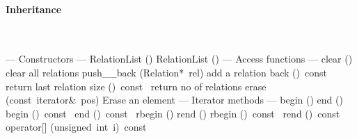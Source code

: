 \documentclass{article}
\begin{document}
\begin{cxxentry}
\begin{cxxclass}
\begin{cxxInheritance}
\paragraph{Inheritance}\strut\smallskip\strut\\
\end{cxxInheritance}
\begin{cxxpublic}
\cxxitem{}
        {--- Constructors --- }
        {}
        {}
        {}
\label{cxx.1.5.1}
\cxxitem{}
        {RelationList}
        {()}
        {}
        {}
\label{cxx.1.5.2}
        {\cxxtilde RelationList}
        {()}
        {}
        {}
\label{cxx.1.5.3}
\cxxitem{}
        {--- Access functions --- }
        {}
        {}
        {}
\label{cxx.1.5.4}
        {clear}
        {()}
        { clear all relations}
        {}
\label{cxx.1.5.5}
        {push\_\_back}
        {(Relation*\ rel)}
        { add a relation}
        {}
\label{cxx.1.5.6}
        {back}
        {()\ const\ }
        { return last relation}
        {}
\label{cxx.1.5.7}
        {size}
        {()\ const\ }
        { return no of relations}
        {}
\label{cxx.1.5.8}
        {erase}
        {(const\ iterator\&\ pos)}
        { Erase an element}
        {}
\label{cxx.1.5.9}
\cxxitem{}
        {--- Iterator methods --- }
        {}
        {}
        {}
\label{cxx.1.5.10}
        {begin}
        {()}
        {}
        {}
\label{cxx.1.5.11}
        {end}
        {()}
        {}
        {}
\label{cxx.1.5.12}
        {begin}
        {()\ const\ }
        {}
        {}
\label{cxx.1.5.13}
        {end}
        {()\ const\ }
        {}
        {}
\label{cxx.1.5.14}
        {rbegin}
        {()}
        {}
        {}
\label{cxx.1.5.15}
        {rend}
        {()}
        {}
        {}
\label{cxx.1.5.16}
        {rbegin}
        {()\ const\ }
        {}
        {}
\label{cxx.1.5.17}
        {rend}
        {()\ const\ }
        {}
        {}
\label{cxx.1.5.18}
        {operator[]}
        {(unsigned\ int\ i)\ const\ }

\end{cxxpublic}
\end{cxxclass}
\end{cxxentry}
\end{document}
